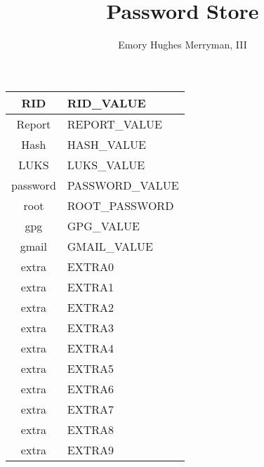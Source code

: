 \documentclass{article}
\begin{document}
\title{Password Store}
\author{Emory Hughes Merryman, III}
\maketitle
\begin{tabular}{||c|p{10cm}||}
  \hline
  RID & RID_VALUE \\ \hline
  Report & REPORT_VALUE \\ \hline
  Hash & HASH_VALUE \\ \hline
  LUKS & LUKS_VALUE \\ \hline
  password & PASSWORD_VALUE \\ \hline
  root & ROOT_PASSWORD \\ \hline
  gpg & GPG_VALUE \\ \hline
  gmail & GMAIL_VALUE \\ \hline
  extra & EXTRA0 \\ \hline
  extra & EXTRA1 \\ \hline
  extra & EXTRA2 \\ \hline
  extra & EXTRA3 \\ \hline
  extra & EXTRA4 \\ \hline
  extra & EXTRA5 \\ \hline
  extra & EXTRA6 \\ \hline
  extra & EXTRA7 \\ \hline
  extra & EXTRA8 \\ \hline
  extra & EXTRA9 \\ \hline
  \hline
\end{tabular}
\end{document}
